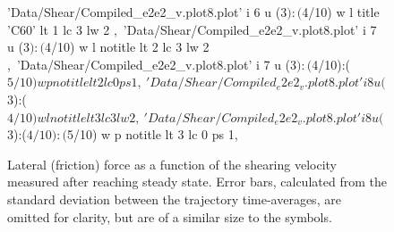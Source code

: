 \documentclass[aps,prb,reprint,superscriptaddress, a4paper]{revtex4-1}
\begin{document}
\begin{figure}
\begin{center}
\begin{gnuplot}[terminal=pdf, terminaloptions={size \SERFigwidth cm, \SERFigheight cm color solid}]
				'Data/Shear/Compiled_e2e2_v.plot8.plot' i 6 u ($3):($4/10) w l title 'C60' lt 1 lc 3 lw 2 ,\				
				'Data/Shear/Compiled_e2e2_v.plot8.plot' i 7 u ($3):($4/10) w l notitle  lt 2 lc 3 lw 2 ,\
				'Data/Shear/Compiled_e2e2_v.plot8.plot' i 7 u ($3):($4/10):($5/10) w p notitle  lt 2 lc 0 ps 1,\
				'Data/Shear/Compiled_e2e2_v.plot8.plot' i 8 u ($3):($4/10) w l notitle  lt 3 lc 3 lw 2 ,\
				'Data/Shear/Compiled_e2e2_v.plot8.plot' i 8 u ($3):($4/10):($5/10) w p notitle  lt 3 lc 0 ps 1,\
		\end{gnuplot}
		\caption{Lateral (friction) force as a function of the shearing velocity measured after reaching steady state. Error bars, calculated from the standard deviation between the trajectory time-averages, are omitted for clarity, but are of a similar size to the symbols.}
		\label{fig:FL_v1}
	\end{center}
 \end{figure}
\end{document}
